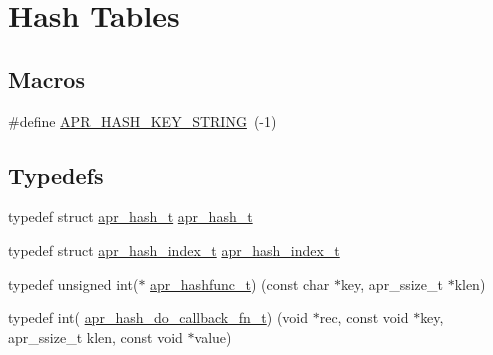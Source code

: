 \hypertarget{group__apr__hash}{}\section{Hash Tables}
\label{group__apr__hash}
\subsection*{Macros}
\begin{DoxyCompactItemize}
\item 
\#define \hyperlink{group__apr__hash_ga3ba32541f2717b394000f87f38c7e12d}{A\+P\+R\+\_\+\+H\+A\+S\+H\+\_\+\+K\+E\+Y\+\_\+\+S\+T\+R\+I\+NG}~(-\/1)
\end{DoxyCompactItemize}
\subsection*{Typedefs}
\begin{DoxyCompactItemize}
\item 
typedef struct \hyperlink{group__apr__hash_ga72ec09b8bde6d874c36bd49df915fff6}{apr\+\_\+hash\+\_\+t} \hyperlink{group__apr__hash_ga72ec09b8bde6d874c36bd49df915fff6}{apr\+\_\+hash\+\_\+t}
\item 
typedef struct \hyperlink{group__apr__hash_ga3b3d353989f6cea4535630634be147f7}{apr\+\_\+hash\+\_\+index\+\_\+t} \hyperlink{group__apr__hash_ga3b3d353989f6cea4535630634be147f7}{apr\+\_\+hash\+\_\+index\+\_\+t}
\item 
typedef unsigned int($\ast$ \hyperlink{group__apr__hash_ga0bf5622266af13a2489c907a101cb156}{apr\+\_\+hashfunc\+\_\+t}) (const char $\ast$key, apr\+\_\+ssize\+\_\+t $\ast$klen)
\item 
typedef int( \hyperlink{group__apr__hash_ga9352d7eed661ad06b7635314530a3227}{apr\+\_\+hash\+\_\+do\+\_\+callback\+\_\+fn\+\_\+t}) (void $\ast$rec, const void $\ast$key, apr\+\_\+ssize\+\_\+t klen, const void $\ast$value)
\end{DoxyCompactItemize}
